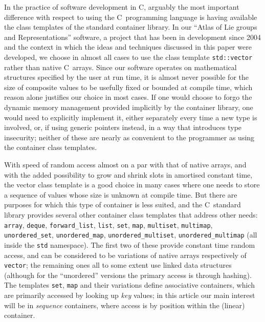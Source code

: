 \documentclass[12pt]{article}
\theoremstyle{plain}
\theoremstyle{definition}
\def\PP{\copy\PPbox}
\newcommand\Cee{\textsc{C}}
\newcommand\Cpp{\Cee\PP}
\newcommand\std[1]{\texttt{std::#1}}
\def\vect.{\std{vector}}
\begin{document}
In the practice of software development in \Cpp, arguably the most important
difference with respect to using the \Cee\ programming language is having
available the class templates of the standard container library. In our ``Atlas
of Lie groups and Representations'' software, a project that has been in
development since 2004 and the context in which the ideas and techniques
discussed in this paper were developed, we choose in almost all cases to use the
class template \vect. rather than native \Cpp\ arrays. Since our software
operates on mathematical structures specified by the user at run time, it is
almost never possible for the size of composite values to be usefully fixed or
bounded at compile time, which reason alone justifies our choice in most cases.
If one would choose to forgo the dynamic memory management provided implicitly
by the container library, one would need to explicitly implement it, either
separately every time a new type is involved, or, if using generic pointers
instead, in a way that introduces type insecurity; neither of these are nearly
as convenient to the programmer as using the container class templates.

With speed of random access almost on a par with that of native arrays, and with
the added possibility to grow and shrink slots in amortised constant time, the
vector class template is a good choice in many cases where one needs to store a
sequence of values whose size is unknown at compile time. But there are purposes
for which this type of container is less suited, and the \Cpp\ standard library
provides several other container class templates that address other needs:
\texttt{array}, \texttt{deque}, \texttt{forward\_list}, \texttt{list},
\texttt{set}, \texttt{map}, \texttt{multiset}, \texttt{multimap},
\texttt{unordered\_set}, \texttt{unordered\_map}, \texttt{unordered\_multiset},
\texttt{unordered\_multimap} (all inside the \texttt{std} namespace). The first
two of these provide constant time random access, and can be considered to be
variations of native arrays respectively of \texttt{vector}; the remaining ones
all to some extent use linked data structures (although for the ``unordered''
versions the primary access is through hashing). The templates \texttt{set},
\texttt{map} and their variations define associative containers, which are
primarily accessed by looking up \emph{key} values; in this article our main
interest will be in \emph{sequence} containers, where access is by position
within the (linear) container.
\end{document}
